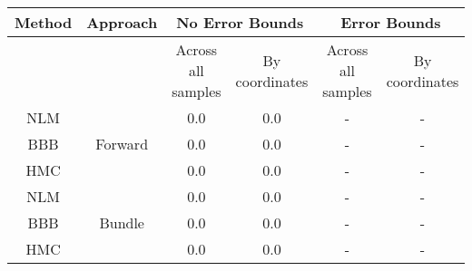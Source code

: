 \documentclass[convert={outext=.png}]{standalone}
\begin{document}
\centering
\label{tab:experimental_results}

\begin{tabular}{c c c c c c}

\hline
\hline
Method & Approach &  \multicolumn{2}{c}{No Error Bounds} & \multicolumn{2}{c}{Error Bounds} \\ \hline
 && Across all samples & By coordinates & Across all samples & By coordinates \\
 NLM & \multirow{3}{*}{Forward} & 0.0 & 0.0 & - & - \\
 BBB &  & 0.0 & 0.0 & - & - \\
 HMC &  & 0.0 & 0.0 & - & - \\
 \hline
 NLM & \multirow{3}{*}{Bundle} & 0.0 & 0.0 & - & - \\
 BBB &  & 0.0 & 0.0 & - & - \\
 HMC &  & 0.0 & 0.0 & - & - \\
\hline
\hline
\end{tabular}
\end{document}
